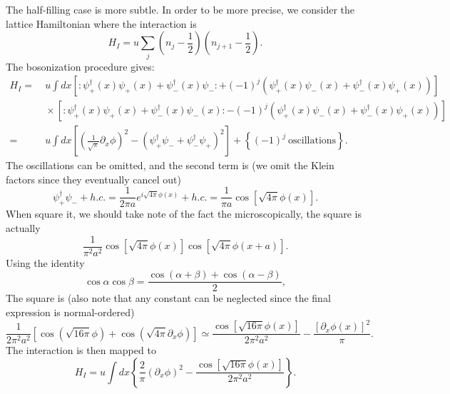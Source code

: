 The half-filling case is more subtle.
In order to be more precise, we consider the lattice Hamiltonian where the interaction is
\begin{equation}
	H_I = u \sum_j \left(n_j-\frac{1}{2}\right) \left(n_{j+1}-\frac{1}{2} \right).
\end{equation}
The bosonization procedure gives:
\begin{equation}
\begin{aligned}
	H_I =& \ u \int dx \left[: \psi_+^{\dagger}(x) \psi_+(x)+\psi_-^{\dagger}(x) \psi_-:+(-1)^{j}\left(\psi_+^{\dagger}(x) \psi_-(x)+\psi_-^{\dagger}(x) \psi_+(x)\right)\right] \\
	&\ \times\left[: \psi_+^{\dagger}(x) \psi_+(x)+\psi_-^{\dagger}(x) \psi_-(x):-(-1)^{j}\left(\psi_+^{\dagger}(x) \psi_-(x)+\psi_-^{\dagger}(x) \psi_+(x)\right)\right] \\
	=&\ u\int dx \left[\left(\frac{1}{\sqrt{\pi}} \partial_{x} \phi\right)^{2}-\left(\psi_+^{\dagger} \psi_- + \psi_-^{\dagger} \psi_+\right)^{2} \right] 
		+\left\{(-1)^j\ \text{oscillations} \right\}.
\end{aligned}
\end{equation}
The oscillations can be omitted, and the second term is (we omit the Klein factors since they eventually cancel out)
\begin{equation}
	\psi_+^\dagger \psi_- + h.c.
	= \frac{1}{2\pi a} e^{i\sqrt{4\pi}\phi(x)} + h.c. 
	= \frac{1}{\pi a}\cos\left[\sqrt{4\pi}\phi(x)\right].
\end{equation}
When square it, we should take note of the fact the microscopically, the square is actually
\begin{equation*}
	\frac{1}{\pi^2 a^2} \cos\left[\sqrt{4\pi}\phi(x)\right]\cos\left[\sqrt{4\pi}\phi(x+a)\right].
\end{equation*}
Using the identity
\begin{equation}
	\cos\alpha \cos\beta = \frac{\cos(\alpha+\beta)+\cos(\alpha-\beta)}{2},
\end{equation}
The square is (also note that any constant can be neglected since the final expression is normal-ordered)
\begin{equation}
	\frac{1}{2\pi^2 a^2}\left[\cos\left(\sqrt{16\pi}\phi\right)+\cos\left(\sqrt{4\pi}\partial_x\phi \right)\right]
	\simeq \frac{\cos\left[\sqrt{16\pi}\phi(x)\right]}{2\pi^2 a^2} - \frac{[\partial_x\phi(x)]^2}{\pi}.
\end{equation}
The interaction is then mapped to
\begin{equation}
	H_I = u\int dx \left\{\frac{2}{\pi}(\partial_x\phi)^2 - \frac{\cos\left[\sqrt{16\pi}\phi(x)\right]}{2\pi^2 a^2}\right\}.
\end{equation}


